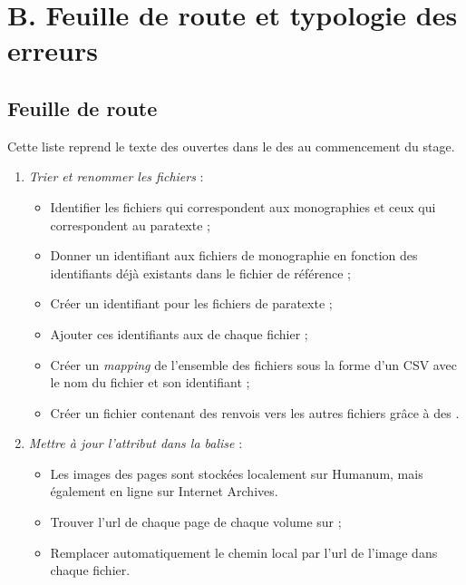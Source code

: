 \renewcommand{\thesection}{B.1}
\chapter{B. Feuille de route et typologie des erreurs}

\section{Feuille de route}
\label{ann:feuille_route}

Cette liste reprend le texte des \issues{} ouvertes dans le \gitlab{} des \odm{} au commencement du stage.

\begin{enumerate}
        \item \textit{Trier et renommer les fichiers} :
    \begin{itemize}
        \item  Identifier les fichiers qui correspondent aux monographies et ceux qui correspondent au paratexte ;
        \item  Donner un identifiant aux fichiers de monographie en fonction des identifiants déjà existants dans le fichier de référence ;
        \item  Créer un identifiant pour les fichiers de paratexte ;
        \item  Ajouter ces identifiants aux  de chaque fichier ;
        \item  Créer un \textit{mapping} de l’ensemble des fichiers sous la forme d’un CSV avec le nom du fichier et son identifiant ;
        \item  Créer un fichier  contenant des renvois vers les autres fichiers grâce à des .
    \end{itemize}

    \item \textit{Mettre à jour l’attribut  dans la balise } :
    \begin{itemize}
        \item  Les images des pages sont stockées localement sur Humanum, mais également en ligne sur Internet Archives.
        \item  Trouver l’url de chaque page de chaque volume sur \ia ;
        \item  Remplacer automatiquement le chemin local par l’url de l’image dans chaque fichier.
    \end{itemize}


\end{enumerate}
